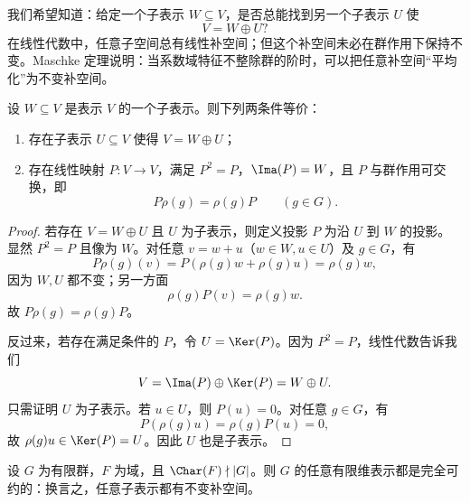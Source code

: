 我们希望知道：给定一个子表示 $W\subseteq V$，是否总能找到另一个子表示 $U$ 使
\[
V=W\oplus U?
\]
在线性代数中，任意子空间总有线性补空间；但这个补空间未必在群作用下保持不变。Maschke 定理说明：当系数域特征不整除群的阶时，可以把任意补空间“平均化”为不变补空间。

\begin{proposition}
设 $W\subseteq V$ 是表示 $V$ 的一个子表示。则下列两条件等价：
\begin{enumerate}[label=\textnormal{(\arabic*)}]
  \item 存在子表示 $U\subseteq V$ 使得 $V=W\oplus U$；
  \item 存在线性映射 $P:V\to V$，满足 $P^2=P$，$\Ima(P)=W$，且 $P$ 与群作用可交换，即
  \[
  P\rho(g)=\rho(g)P\qquad (g\in G).
  \]
\end{enumerate}
\end{proposition}

\begin{proof}
若存在 $V=W\oplus U$ 且 $U$ 为子表示，则定义投影 $P$ 为沿 $U$ 到 $W$ 的投影。显然 $P^2=P$ 且像为 $W$。对任意 $v=w+u$（$w\in W,u\in U$）及 $g\in G$，有
\[
P\rho(g)(v)=P(\rho(g)w+\rho(g)u)=\rho(g)w,
\]
因为 $W,U$ 都不变；另一方面
\[
\rho(g)P(v)=\rho(g)w.
\]
故 $P\rho(g)=\rho(g)P$。

反过来，若存在满足条件的 $P$，令 $U=\Ker(P)$。因为 $P^2=P$，线性代数告诉我们
\[
V=\Ima(P)\oplus \Ker(P)=W\oplus U.
\]
只需证明 $U$ 为子表示。若 $u\in U$，则 $P(u)=0$。对任意 $g\in G$，有
\[
P(\rho(g)u)=\rho(g)P(u)=0,
\]
故 $\rho(g)u\in \Ker(P)=U$。因此 $U$ 也是子表示。
\end{proof}

\begin{theorem}[Maschke 定理]
设 $G$ 为有限群，$F$ 为域，且 $\Char(F)\nmid |G|$。则 $G$ 的任意有限维表示都是完全可约的：换言之，任意子表示都有不变补空间。
\end{theorem}

